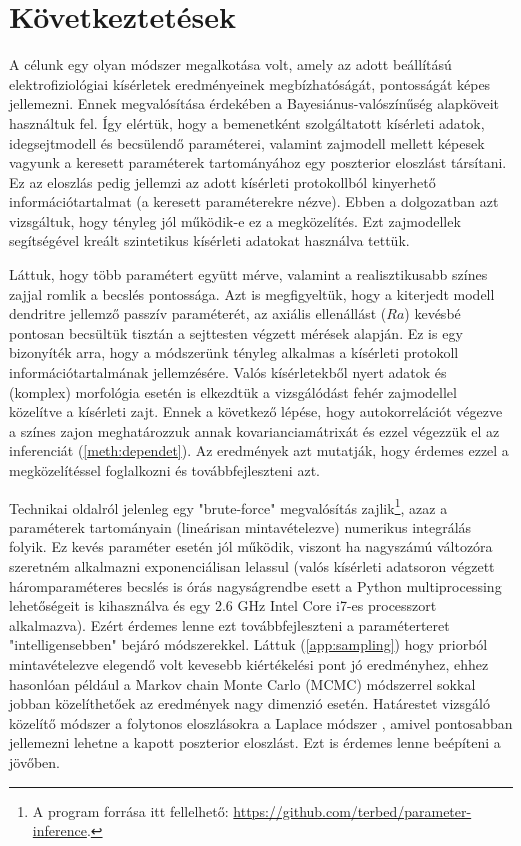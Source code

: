 \section{Következtetések}
A célunk egy olyan módszer megalkotása volt, amely az adott beállítású elektrofiziológiai kísérletek eredményeinek megbízhatóságát, pontosságát képes jellemezni. Ennek megvalósítása érdekében a Bayesiánus-valószínűség alapköveit használtuk fel. Így elértük, hogy a bemenetként szolgáltatott kísérleti adatok, idegsejtmodell és becsülendő paraméterei, valamint zajmodell mellett képesek vagyunk a keresett paraméterek tartományához egy poszterior eloszlást társítani. Ez az eloszlás pedig jellemzi az adott kísérleti protokollból kinyerhető információtartalmat (a keresett paraméterekre nézve). Ebben a dolgozatban azt vizsgáltuk, hogy tényleg jól működik-e ez a megközelítés. Ezt zajmodellek segítségével kreált szintetikus kísérleti adatokat használva tettük.

Láttuk, hogy több paramétert együtt mérve, valamint a realisztikusabb színes zajjal romlik a becslés pontossága. Azt is megfigyeltük, hogy a kiterjedt modell dendritre jellemző passzív paraméterét, az axiális ellenállást ($Ra$) kevésbé pontosan becsültük tisztán a sejttesten végzett mérések alapján. Ez is egy bizonyíték arra, hogy a módszerünk tényleg alkalmas a kísérleti protokoll információtartalmának jellemzésére. Valós kísérletekből nyert adatok és (komplex) morfológia esetén is elkezdtük a vizsgálódást fehér zajmodellel közelítve a kísérleti zajt. Ennek a következő lépése, hogy autokorrelációt végezve a színes zajon meghatározzuk annak kovarianciamátrixát és ezzel végezzük el az inferenciát (\ref{meth:dependet}). Az eredmények azt mutatják, hogy érdemes ezzel a megközelítéssel foglalkozni és továbbfejleszteni azt.

Technikai oldalról jelenleg egy "brute-force" megvalósítás zajlik\footnote{A program forrása itt fellelhető: \href{https://github.com/terbed/parameter-inference}{https://github.com/terbed/parameter-inference}.}, azaz a paraméterek tartományain (lineárisan mintavételezve) numerikus integrálás folyik. Ez kevés paraméter esetén jól működik, viszont ha nagyszámú változóra szeretném alkalmazni exponenciálisan lelassul (valós kísérleti adatsoron végzett háromparaméteres becslés is órás nagyságrendbe esett a Python multiprocessing lehetőségeit is kihasználva és egy 2.6 GHz Intel Core i7-es processzort alkalmazva). Ezért érdemes lenne ezt  továbbfejleszteni a paraméterteret "intelligensebben" bejáró módszerekkel. Láttuk (\ref{app:sampling}) hogy priorból mintavételezve elegendő volt kevesebb kiértékelési pont jó eredményhez, ehhez hasonlóan például a Markov chain Monte Carlo (MCMC) módszerrel sokkal jobban közelíthetőek az eredmények nagy dimenzió esetén. Határestet vizsgáló közelítő módszer a folytonos eloszlásokra a Laplace módszer \cite{azevedo1994laplace}, amivel pontosabban jellemezni lehetne a kapott poszterior eloszlást. Ezt is érdemes lenne beépíteni a jövőben.

